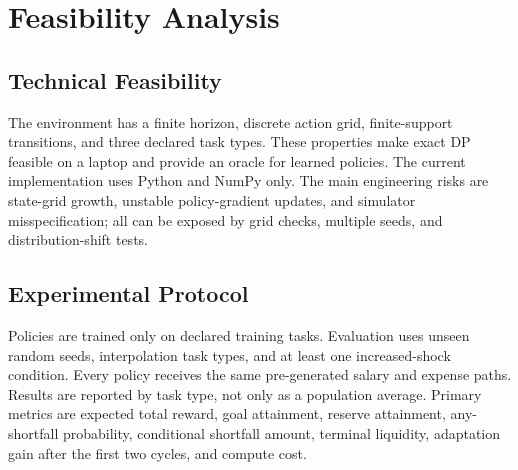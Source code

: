 \section{Feasibility Analysis}\label{sec:feasibility_analysis}

\subsection{Technical Feasibility}
The environment has a finite horizon, discrete action grid, finite-support transitions, and three declared task types. These properties make exact DP feasible on a laptop and provide an oracle for learned policies. The current implementation uses Python and NumPy only. The main engineering risks are state-grid growth, unstable policy-gradient updates, and simulator misspecification; all can be exposed by grid checks, multiple seeds, and distribution-shift tests.

\subsection{Experimental Protocol}
Policies are trained only on declared training tasks. Evaluation uses unseen random seeds, interpolation task types, and at least one increased-shock condition. Every policy receives the same pre-generated salary and expense paths. Results are reported by task type, not only as a population average. Primary metrics are expected total reward, goal attainment, reserve attainment, any-shortfall probability, conditional shortfall amount, terminal liquidity, adaptation gain after the first two cycles, and compute cost.

